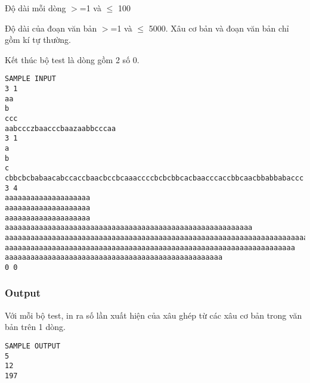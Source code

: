    Độ dài mỗi dòng $>$=1 và  $\le$ 100  

   Độ dài của đoạn văn bản $>$=1 và  $\le$ 5000. Xâu cơ bản và đoạn văn bản chỉ gồm kí tự thường.  

   Kết thúc bộ test là dòng gồm 2 số 0.  
\begin{verbatim}
SAMPLE INPUT
3 1
aa
b
ccc
aabccczbaacccbaazaabbcccaa
3 1
a
b
c
cbbcbcbabaacabccaccbaacbccbcaaaccccbcbcbbcacbaacccaccbbcaacbbabbabaccc
3 4
aaaaaaaaaaaaaaaaaaaa
aaaaaaaaaaaaaaaaaaaa
aaaaaaaaaaaaaaaaaaaa
aaaaaaaaaaaaaaaaaaaaaaaaaaaaaaaaaaaaaaaaaaaaaaaaaaaaaaaaaa
aaaaaaaaaaaaaaaaaaaaaaaaaaaaaaaaaaaaaaaaaaaaaaaaaaaaaaaaaaaaaaaaaaaaaaaaaaaaaaa
aaaaaaaaaaaaaaaaaaaaaaaaaaaaaaaaaaaaaaaaaaaaaaaaaaaaaaaaaaaaaaaaaaaa
aaaaaaaaaaaaaaaaaaaaaaaaaaaaaaaaaaaaaaaaaaaaaaaaaaa
0 0

\end{verbatim}

\subsubsection{   Output  }



   Với mỗi bộ test, in ra số lần xuất hiện của xâu ghép từ các xâu cơ bản trong văn bản trên 1 dòng.  
\begin{verbatim}
SAMPLE OUTPUT
5
12
197
\end{verbatim}

